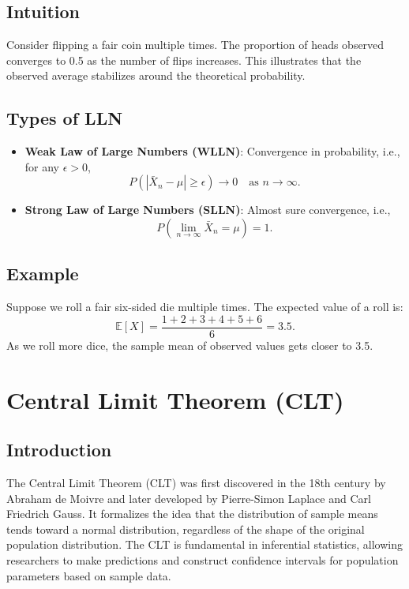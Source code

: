 \documentclass{book}
\begin{document}
\subsection{Intuition}
Consider flipping a fair coin multiple times. The proportion of heads observed converges to 0.5 as the number of flips increases. This illustrates that the observed average stabilizes around the theoretical probability.

\subsection{Types of LLN}
\begin{itemize}
    \item \textbf{Weak Law of Large Numbers (WLLN)}: Convergence in probability, i.e., for any $\epsilon > 0$, 
    \begin{equation}
        P(|\bar{X}_n - \mu| \geq \epsilon) \to 0 \quad \text{as } n \to \infty.
    \end{equation}
    \item \textbf{Strong Law of Large Numbers (SLLN)}: Almost sure convergence, i.e.,
    \begin{equation}
        P\left( \lim_{n \to \infty} \bar{X}_n = \mu \right) = 1.
    \end{equation}
\end{itemize}

\subsection{Example}
Suppose we roll a fair six-sided die multiple times. The expected value of a roll is:
\begin{equation}
    \mathbb{E}[X] = \frac{1+2+3+4+5+6}{6} = 3.5.
\end{equation}
As we roll more dice, the sample mean of observed values gets closer to 3.5.

\section{Central Limit Theorem (CLT)}

\subsection{Introduction}
The Central Limit Theorem (CLT) was first discovered in the 18th century by Abraham de Moivre and later developed by Pierre-Simon Laplace and Carl Friedrich Gauss. It formalizes the idea that the distribution of sample means tends toward a normal distribution, regardless of the shape of the original population distribution. The CLT is fundamental in inferential statistics, allowing researchers to make predictions and construct confidence intervals for population parameters based on sample data.
\end{document}
